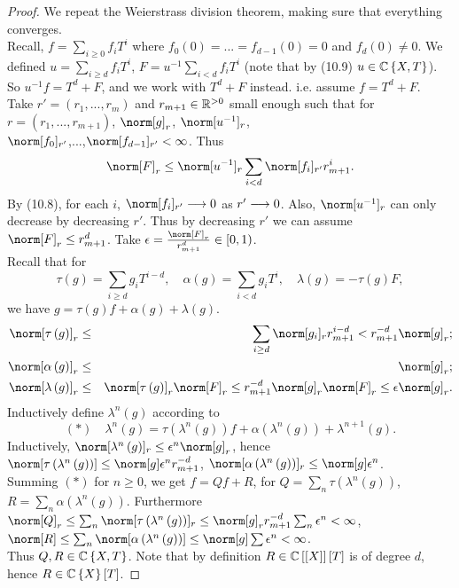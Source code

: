 \begin{proof}
We repeat the Weierstrass division theorem, making sure that everything
converges.\\
Recall, $f=\sum_{i\geq0}f_{i}T^{i}$ where $f_{0}\left(0\right)=...=f_{d-1}\left(0\right)=0$
and $f_{d}\left(0\right)\neq0$. We defined $u=\sum_{i\geq d}f_{i}T^{i}$,
$F=u^{-1}\sum_{i<d}f_{i}T^{i}$ (note that by (10.9) $u\in\mathbb{C}\left\{ X,T\right\} $).
So $u^{-1}f=T^{d}+F$, and we work with $T^{d}+F$ instead. i.e. assume
$f=T^{d}+F$.\\
Take $r'=\left(r_{1},...,r_{m}\right)$ and $r_{m+1}\in\mathbb{R}^{>0}$ small
enough such that for $r=\left(r_{1},...,r_{m+1}\right)$, $\norm[g]_{r}$,
$\norm[u^{-1}]_{r}$, \\
$\norm[f_{0}]_{r'}$,...,$\norm[f_{d-1}]_{r'}<\infty$. Thus 
\[
\norm[F]_{r}\leq\norm[u^{-1}]_{r}\sum_{i<d}\norm[f_{i}]_{r'}r_{m+1}^{i}.
\]
By (10.8), for each $i$, $\norm[f_{i}]_{r'}\lto0$ as $r'\longrightarrow0$.
Also, $\norm[u^{-1}]_{r}$ can only decrease by decreasing $r'$.
Thus by decreasing $r'$ we can assume $\norm[F]_{r}\leq r_{m+1}^{d}$.
Take $\epsilon=\frac{\norm[F]_{r}}{r_{m+1}^{d}}\in\left[0,1\right)$.
\\
Recall that for 
\[
\tau\left(g\right)=\sum_{i\geq d}g_{i}T^{i-d},\quad\alpha\left(g\right)=\sum_{i<d}g_{i}T^{i},\quad\lambda\left(g\right)=-\tau\left(g\right)F,
\]
we have $g=\tau\left(g\right)f+\alpha\left(g\right)+\lambda\left(g\right)$.
\begin{eqnarray*}
\norm[\tau\left(g\right)]_{r} & \leq & \sum_{i\geq d}\norm[g_{i}]_{r}r_{m+1}^{i-d}<r_{m+1}^{-d}\norm[g]_{r};\\
\norm[\alpha\left(g\right)]_{r} & \leq & \norm[g]_{r};\\
\norm[\lambda\left(g\right)]_{r} & \leq & \norm[\tau\left(g\right)]_{r}\norm[F]_{r}\leq r_{m+1}^{-d}\norm[g]_{r}\norm[F]_{r}\leq\epsilon\norm[g]_{r}.
\end{eqnarray*}
Inductively define $\lambda^{n}\left(g\right)$ according to 
\[
\left(\ast\right)\quad\lambda^{n}\left(g\right)=\tau\left(\lambda^{n}\left(g\right)\right)f+\alpha\left(\lambda^{n}\left(g\right)\right)+\lambda^{n+1}\left(g\right).
\]
Inductively, $\norm[\lambda^{n}\left(g\right)]_{r}\leq\epsilon^{n}\norm[g]_{r}$,
hence $\norm[\tau\left(\lambda^{n}\left(g\right)\right)]\leq\norm[g]\epsilon^{n}r_{m+1}^{-d}$,
$\norm[\alpha\left(\lambda^{n}\left(g\right)\right)]_{r}\leq\norm[g]\epsilon^{n}$.\\
Summing $\left(\ast\right)$ for $n\geq0$, we get $f=Qf+R$, for
$Q=\sum_{n}\tau\left(\lambda^{n}\left(g\right)\right)$, $R=\sum_{n}\alpha\left(\lambda^{n}\left(g\right)\right)$.
Furthermore $\norm[Q]_{r}\leq\sum_{n}\norm[\tau\left(\lambda^{n}\left(g\right)\right)]_{r}\leq\norm[g]_{r}r_{m+1}^{-d}\sum_{n}\epsilon^{n}<\infty$,
$\norm[R]\leq\sum_{n}\norm[\alpha\left(\lambda^{n}\left(g\right)\right)]\leq\norm[g]\sum\epsilon^{n}<\infty$.
\\
Thus $Q,R\in\mathbb{C}\left\{ X,T\right\} $. Note that by definition $R\in\mathbb{C}\left[\left[X\right]\right]\left[T\right]$
is of degree $d$, hence $R\in\mathbb{C}\left\{ X\right\} \left[T\right]$.\end{proof}
